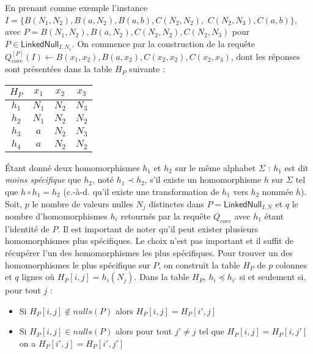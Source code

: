 \begin{example}
	\label{ex:update:core:tableau}
	En prenant comme exemple l'instance $I = \{B(N_1, N_2), B(a, N_2), B(a, b), C(N_2, N_2),$ $C(N_2, N_3), C(a, b)\}$, avec $P = {B(N_1, N_2), B(a, N_2), C(N_2, N_2), C(N_2, N_3)}$ pour $P \in \textsf{LinkedNull}_{I,N_1}$.
	On commence par la construction de la requête $Q_{core}^{[P]}(I) \gets B(x_1, x_2), B(a, x_2), C(x_2, x_2), C(x_2, x_3)$, dont les réponses sont présentées dans la table $H_P$ suivante :

	\begin{center}
		\begin{tabular}{c|ccc}
			$H_P$ & $x_1$ & $x_2$ & $x_3$ \\
			\hline
			$h_1$ & $N_1$ & $N_2$ & $N_3$ \\
			$h_2$ & $N_1$ & $N_2$ & $N_2$ \\
			$h_3$ & $a$   & $N_2$ & $N_3$ \\
			$h_4$ & $a$   & $N_2$ & $N_2$ \\
		\end{tabular}
	\end{center}
\end{example}

Étant donné deux homomorphismes $h_1$ et $h_2$ sur le même alphabet $\Sigma$ : $h_1$ est dit \textit{moins spécifique} que $h_2$, noté $h_1 \prec h_2$, s'il existe un homomorphisme $h$ sur $\Sigma$ tel que $h \circ h_1 = h_2$ (c.-à-d. qu'il existe une transformation de $h_1$ vers $h_2$ nommée $h$).
Soit, $p$ le nombre de valeurs nulles $N_j$ distinctes dans $P = \textsf{LinkedNull}_{I,N}$ et $q$ le nombre d'homomorphismes $h_i$ retournés par la requête $Q_{core}$ avec $h_1$ étant l'identité de $P$.
Il est important de noter qu'il peut exister plusieurs homomorphismes plus spécifiques.
Le choix n'est pas important et il suffit de récupérer l'un des homomorphismes les plus spécifiques.
Pour trouver un des homomorphismes le plus spécifique sur $P$, on construit la table $H_P$ de $p$ colonnes et $q$ lignes où $H_P[i, j] = h_i(N_j)$.
Dans la table $H_P$, $h_i \preceq h_{i'}$ si et seulement si, pour tout $j$ :

\begin{itemize}
	\item Si $H_P[i, j] \notin nulls(P)$ alors $H_P[i, j] = H_P[i', j]$
	\item Si $H_P[i, j] \in nulls(P)$ alors pour tout $j' \neq j$ tel que $H_P[i, j] = H_P[i, j']$ on a $H_P[i', j] = H_P[i', j']$
\end{itemize}

